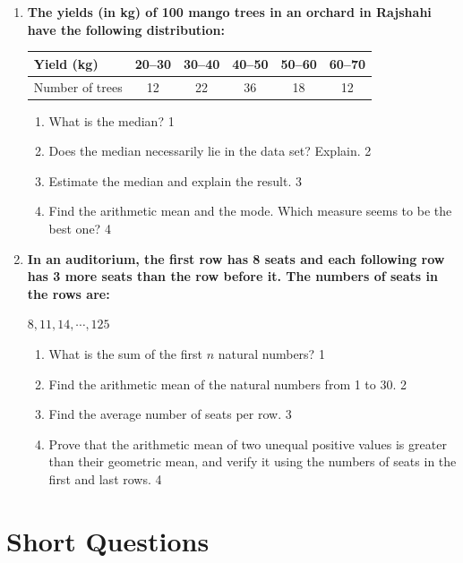\documentclass[a4paper,oneside]{book}
\begin{document}
\begin{enumerate}
\item
\textbf{The yields (in kg) of 100 mango trees in an orchard in Rajshahi have the following distribution:}
\begin{center}
\begin{tabular}{l|ccccc}
Yield (kg) & 20--30 & 30--40 & 40--50 & 50--60 & 60--70 \\ \hline
Number of trees & 12 & 22 & 36 & 18 & 12
\end{tabular}
\end{center}
\begin{enumerate}
  \item What is the median? \hfill 1
  \item Does the median necessarily lie in the data set? Explain. \hfill 2
  \item Estimate the median and explain the result. \hfill 3
  \item Find the arithmetic mean and the mode. Which measure seems to be the best one? \hfill 4
\end{enumerate}

\item
\textbf{In an auditorium, the first row has 8 seats and each following row has 3 more seats than the row before it. The numbers of seats in the rows are:}
\begin{center}
$8, 11, 14, \cdots, 125$
\end{center}
\begin{enumerate}
  \item What is the sum of the first $n$ natural numbers? \hfill 1
  \item Find the arithmetic mean of the natural numbers from 1 to 30. \hfill 2
  \item Find the average number of seats per row. \hfill 3
  \item Prove that the arithmetic mean of two unequal positive values is greater than their geometric mean, and verify it using the numbers of seats in the first and last rows. \hfill 4
\end{enumerate}

\end{enumerate}

\section{Short Questions}
\end{document}
